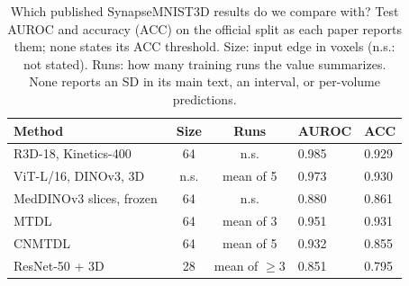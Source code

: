 \begin{table}[t]
\caption{Which published SynapseMNIST3D results do we compare with? Test AUROC and accuracy (ACC) on the official split as each paper reports them; none states its ACC threshold. Size: input edge in voxels (n.s.: not stated). Runs: how many training runs the value summarizes. None reports an SD in its main text, an interval, or per-volume predictions.}
\label{tab:published}
\centering
\footnotesize
\setlength{\tabcolsep}{3pt}
\begin{tabular}{@{}lccll@{}}
\toprule
Method & Size & Runs & AUROC & ACC \\
\midrule
R3D-18, Kinetics-400~\cite{nuwagira2026topocam} & 64 & n.s. & 0.985 & 0.929 \\
ViT-L/16, DINOv3, 3D~\cite{yu2026planecycle} & n.s. & mean of 5 & 0.973 & 0.930 \\
MedDINOv3 slices, frozen~\cite{park2026axial} & 64 & n.s. & 0.880 & 0.861 \\
MTDL~\cite{liu2026manifold} & 64 & mean of 3 & 0.951 & 0.931 \\
CNMTDL~\cite{wachira2026combinatorial} & 64 & mean of 5 & 0.932 & 0.855 \\
ResNet-50 + 3D~\cite{yang2023medmnist} & 28 & mean of $\geq$3 & 0.851 & 0.795 \\
\bottomrule
\end{tabular}
\end{table}
